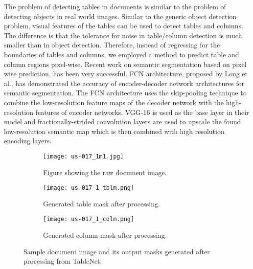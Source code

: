 \documentclass[conference]{IEEEtran}
\begin{document}
The problem of detecting  tables in documents is similar to the problem of detecting objects in real world images. Similar to the generic object detection problem, visual features of the tables can be used to detect tables and columns. The difference is that the tolerance for noise in table/column detection is much smaller than in object detection. Therefore, instead of regressing for the boundaries of tables and columns, we employed a  method to predict table and column regions pixel-wise. Recent work on semantic segmentation based on pixel wise prediction, has been very successful. FCN architecture, proposed by Long et al.\cite{DBLP:journals/corr/LongSD14}, has demonstrated the accuracy of encoder-decoder network architectures for semantic segmentation. The FCN architecture uses the skip-pooling technique to combine the low-resolution feature maps  of the decoder network with the high-resolution features of encoder networks. VGG-16 is used as the base layer in their model and fractionally-strided convolution layers are used to upscale the found low-resolution semantic map which is then combined with high resolution encoding layers.



\begin{figure*}
  \begin{subfigure}[b]{0.32\textwidth}
    \texttt{[image: us-017\_1m1.jpg]}
    \caption{Figure showing the raw document image.}
    \label{fig:1}
  \end{subfigure}
\begin{subfigure}[b]{0.32\textwidth}
    \texttt{[image: us-017\_1\_tblm.png]}
    \caption{Generated table mask after processing.}
    \label{fig:2}
  \end{subfigure}
\begin{subfigure}[b]{0.32\textwidth}
    \texttt{[image: us-017\_1\_colm.png]}
    \caption{Generated column mask after processing.}
    \label{fig:3}
  \end{subfigure}
  \caption{Sample document image and its output masks generated after processing from TableNet.}
  \label{output}
\end{figure*}
\end{document}
